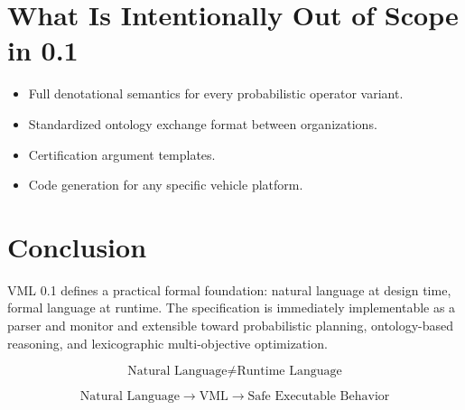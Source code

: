 \documentclass[11pt,a4paper]{article}
\begin{document}
\section{What Is Intentionally Out of Scope in 0.1}
\begin{itemize}[leftmargin=*]
  \item Full denotational semantics for every probabilistic operator variant.
  \item Standardized ontology exchange format between organizations.
  \item Certification argument templates.
  \item Code generation for any specific vehicle platform.
\end{itemize}

\section{Conclusion}
VML 0.1 defines a practical formal foundation: natural language at design time, formal language at runtime. The specification is immediately implementable as a parser and monitor and extensible toward probabilistic planning, ontology-based reasoning, and lexicographic multi-objective optimization.

\[
\text{Natural Language} \neq \text{Runtime Language}
\]

\[
\text{Natural Language} \rightarrow \text{VML} \rightarrow \text{Safe Executable Behavior}
\]
\end{document}

